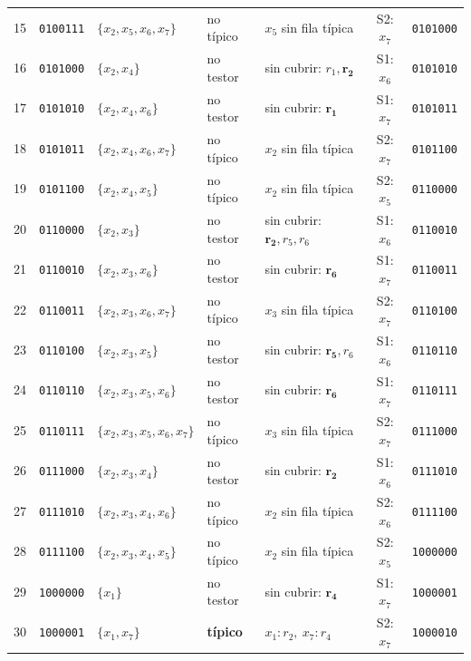 \begin{tabular}{r c l l l c c}
15 & \texttt{0100111} & $\{x_{2},x_{5},x_{6},x_{7}\}$ & no típico & $x_{5}$ sin fila típica & S2: $x_{7}$ & \texttt{0101000} \\
16 & \texttt{0101000} & $\{x_{2},x_{4}\}$ & no testor & sin cubrir: $r_{1},\mathbf{r}_{\mathbf{2}}$ & S1: $x_{6}$ & \texttt{0101010} \\
17 & \texttt{0101010} & $\{x_{2},x_{4},x_{6}\}$ & no testor & sin cubrir: $\mathbf{r}_{\mathbf{1}}$ & S1: $x_{7}$ & \texttt{0101011} \\
18 & \texttt{0101011} & $\{x_{2},x_{4},x_{6},x_{7}\}$ & no típico & $x_{2}$ sin fila típica & S2: $x_{7}$ & \texttt{0101100} \\
19 & \texttt{0101100} & $\{x_{2},x_{4},x_{5}\}$ & no típico & $x_{2}$ sin fila típica & S2: $x_{5}$ & \texttt{0110000} \\
20 & \texttt{0110000} & $\{x_{2},x_{3}\}$ & no testor & sin cubrir: $\mathbf{r}_{\mathbf{2}},r_{5},r_{6}$ & S1: $x_{6}$ & \texttt{0110010} \\
21 & \texttt{0110010} & $\{x_{2},x_{3},x_{6}\}$ & no testor & sin cubrir: $\mathbf{r}_{\mathbf{6}}$ & S1: $x_{7}$ & \texttt{0110011} \\
22 & \texttt{0110011} & $\{x_{2},x_{3},x_{6},x_{7}\}$ & no típico & $x_{3}$ sin fila típica & S2: $x_{7}$ & \texttt{0110100} \\
23 & \texttt{0110100} & $\{x_{2},x_{3},x_{5}\}$ & no testor & sin cubrir: $\mathbf{r}_{\mathbf{5}},r_{6}$ & S1: $x_{6}$ & \texttt{0110110} \\
24 & \texttt{0110110} & $\{x_{2},x_{3},x_{5},x_{6}\}$ & no testor & sin cubrir: $\mathbf{r}_{\mathbf{6}}$ & S1: $x_{7}$ & \texttt{0110111} \\
25 & \texttt{0110111} & $\{x_{2},x_{3},x_{5},x_{6},x_{7}\}$ & no típico & $x_{3}$ sin fila típica & S2: $x_{7}$ & \texttt{0111000} \\
26 & \texttt{0111000} & $\{x_{2},x_{3},x_{4}\}$ & no testor & sin cubrir: $\mathbf{r}_{\mathbf{2}}$ & S1: $x_{6}$ & \texttt{0111010} \\
27 & \texttt{0111010} & $\{x_{2},x_{3},x_{4},x_{6}\}$ & no típico & $x_{2}$ sin fila típica & S2: $x_{6}$ & \texttt{0111100} \\
28 & \texttt{0111100} & $\{x_{2},x_{3},x_{4},x_{5}\}$ & no típico & $x_{2}$ sin fila típica & S2: $x_{5}$ & \texttt{1000000} \\
29 & \texttt{1000000} & $\{x_{1}\}$ & no testor & sin cubrir: $\mathbf{r}_{\mathbf{4}}$ & S1: $x_{7}$ & \texttt{1000001} \\
30 & \texttt{1000001} & $\{x_{1},x_{7}\}$ & \textbf{típico} & $x_{1}{:}r_{2},\ x_{7}{:}r_{4}$ & S2: $x_{7}$ & \texttt{1000010} \\

\end{tabular}
